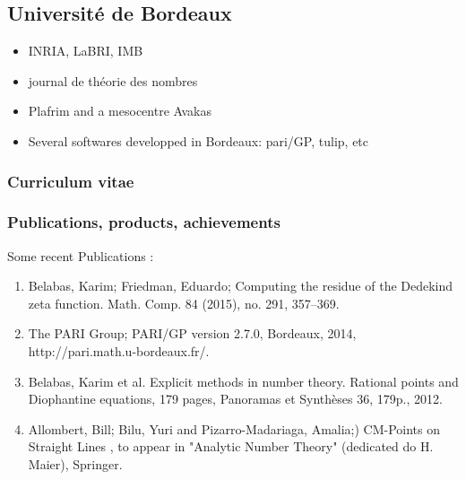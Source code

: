 \subsection*{Université de Bordeaux}



\begin{itemize}
\item INRIA, LaBRI, IMB
\item journal de th\'eorie des nombres
\item Plafrim and a mesocentre Avakas
\item Several softwares developped in Bordeaux: pari/GP, tulip, etc
\end{itemize}


\subsubsection*{Curriculum vitae}



%




\subsubsection*{Publications, products, achievements}

Some recent Publications :
\begin{enumerate}
\item 
Belabas, Karim; Friedman, Eduardo; Computing the residue of the Dedekind
zeta function.  Math. Comp. 84 (2015), no. 291, 357–369. 

\item
The PARI Group; PARI/GP version 2.7.0, Bordeaux, 2014,
http://pari.math.u-bordeaux.fr/.

\item
Belabas, Karim et al. Explicit methods in number theory. Rational points and
Diophantine equations, 179 pages, Panoramas et Synthèses 36, 179p., 2012.

\item
Allombert, Bill; Bilu, Yuri and Pizarro-Madariaga, Amalia;) CM-Points on
Straight Lines , to appear in "Analytic Number Theory" (dedicated do H. Maier),
Springer. 
\end{enumerate}



